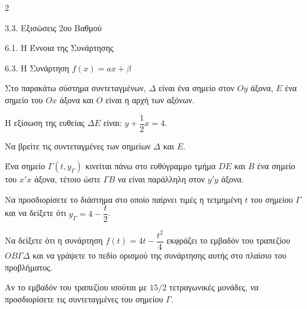 \begin{ylh}{2}
    \item 3.3. Εξισώσεις 2ου Βαθμού
    \item 6.1. Η Έννοια της Συνάρτησης
    \item 6.3. Η Συνάρτηση $f(x)=ax+\beta$
\end{ylh}

Στο παρακάτω σύστημα συντεταγμένων, $\varDelta$ είναι ένα σημείο στον $Oy$ άξονα, $E$ ένα σημείο του $Ox$ άξονα και $O$ είναι η αρχή των αξόνων.
\begin{center}
\end{center}
Η εξίσωση της ευθείας $\varDelta E$ είναι: $y + \dfrac{1}{2}x = 4$.
\begin{alist}
\item Να βρείτε τις συντεταγμένες των σημείων $\varDelta$ και $E$. 
\end{alist}
Ένα σημείο $\Gamma(t, y_\Gamma)$ κινείται πάνω στο ευθύγραμμο τμήμα $DE$ και $B$ ένα σημείο του $x'x$ άξονα, τέτοιο ώστε $\Gamma B$ να είναι παράλληλη στον $y'y$ άξονα.
\begin{alist}[resume]
\item Να προσδιορίσετε το διάστημα στο οποίο παίρνει τιμές η τετμημένη $t$ του σημείου $\Gamma$ και να δείξετε ότι $y_\Gamma = 4 - \dfrac{t}{2}$. 
\item Να δείξετε ότι η συνάρτηση $f(t) = 4t - \dfrac{t^2}{4}$ εκφράζει το εμβαδόν του τραπεζίου $OB\Gamma\varDelta$ και να γράψετε το πεδίο ορισμού της συνάρτησης αυτής στο πλαίσιο του προβλήματος.
\item Αν το εμβαδόν του τραπεζίου ισούται με $15/2$ τετραγωνικές μονάδες, να προσδιορίσετε τις συντεταγμένες του σημείου $\Gamma$. 
\end{alist}

